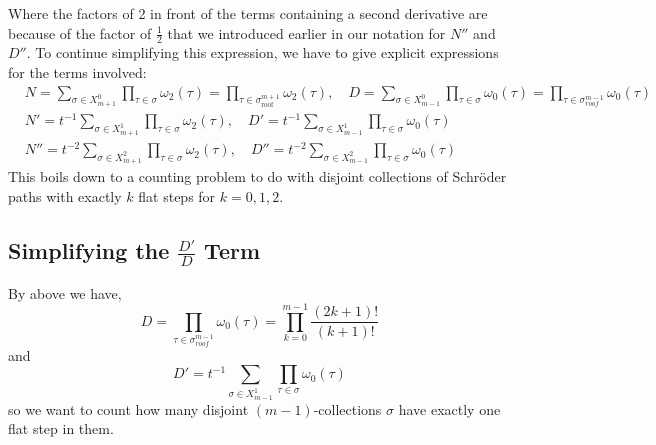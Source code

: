 \documentclass[11pt]{article}
\theoremstyle{mythm}
\begin{document}
Where the factors of 2 in front of the terms containing a second derivative are because of the factor of $\frac{1}{2}$ that we introduced earlier in our notation for $N''$ and $D''$. To continue simplifying this expression, we have to give explicit expressions for the terms involved:
\begin{align*}
&N = \sum\limits_{\sigma\in X_{m+1}^0}\prod\limits_{\tau\in\sigma}\omega_2(\tau) = \prod\limits_{\tau\in\sigma_{\text{roof}}^{m+1}}\omega_2(\tau),\quad D = \sum\limits_{\sigma\in X_{m-1}^0}\prod\limits_{\tau\in\sigma}\omega_0(\tau) = \prod\limits_{\tau\in\sigma_{roof}^{m-1}}\omega_0(\tau) \\
&N' = t^{-1}\sum\limits_{\sigma\in X_{m+1}^1}\prod\limits_{\tau\in\sigma}\omega_2(\tau),\quad D' = t^{-1}\sum\limits_{\sigma\in X_{m-1}^1}\prod\limits_{\tau\in\sigma}\omega_0(\tau) \\
&N'' = t^{-2}\sum\limits_{\sigma\in X_{m+1}^2}\prod\limits_{\tau\in\sigma}\omega_2(\tau),\quad D'' = t^{-2}\sum\limits_{\sigma\in X_{m-1}^2}\prod\limits_{\tau\in\sigma}\omega_0(\tau)
\end{align*}
This boils down to a counting problem to do with disjoint collections of Schröder paths with exactly $k$ flat steps for $k = 0,1,2$.

\subsection{Simplifying the $\frac{D'}{D}$ Term}

By above we have,
\begin{equation*}
D = \prod\limits_{\tau\in\sigma_{roof}^{m-1}}\omega_0(\tau) = \prod\limits_{k=0}^{m-1}\frac{(2k+1)!}{(k+1)!}
\end{equation*}
and
\begin{equation*}
D' = t^{-1}\sum\limits_{\sigma\in X_{m-1}^1}\prod\limits_{\tau\in\sigma}\omega_0(\tau)
\end{equation*}
so we want to count how many disjoint $(m-1)$-collections $\sigma$ have exactly one flat step in them.
\end{document}

